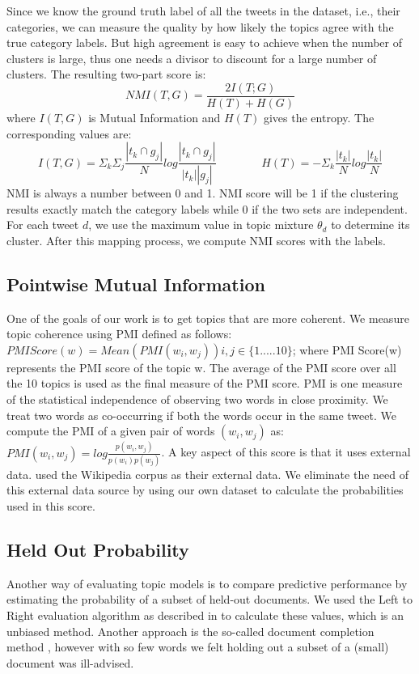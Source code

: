 \documentclass[10pt,a5paper,twoside]{article}
\begin{document}
Since we know the ground truth label of all the tweets in the dataset,
i.e., their categories, we can measure the quality by how likely the
topics agree with the true category labels.
But high agreement is easy to achieve when the number of clusters is
large, thus one needs a divisor to discount for a large number of clusters.
The resulting two-part score is:
\[
NMI(T,G) = \frac{2 I(T;G)}{H(T) + H(G)} 
\]
where $I(T,G)$ is Mutual Information and $H(T)$ gives the entropy. The 
corresponding values are:\vspace{-3pt}
\[
I(T,G) = \Sigma_{k} \Sigma_{j} \frac{|t_{k} \cap g_{j}|}{N} log \frac{|t_{k} \cap g_{j}|}{|t_{k}| |g_{j}|} 
~~~~~~~~~~~~~~~~~~
H(T) = - \Sigma_k \frac{|t_k|}{N} log \frac{|t_k|}{N} 
\]
NMI \cite{MRS08} is always a number between 0 and 1. NMI score will be
1 if the clustering results exactly match the category labels while 0
if the two sets are independent. For each tweet $d$, we use the
maximum value in topic mixture $ \theta_{d} $ to determine its
cluster. After this mapping process, we compute NMI scores with the
labels.


\subsection{Pointwise Mutual Information}

One of the goals of our work is to get topics that are more coherent. 
We measure topic coherence using PMI defined as follows:
$PMI Score(w) = Mean ( PMI(w_i,w_j) )  i,j \in \lbrace1.....10\rbrace $;
where PMI Score(w) represents the PMI score of the topic w. The average of the PMI score over all the 10 topics is used as the final measure of the PMI score. PMI is one measure of the statistical independence of observing two words in
close proximity. We treat two words as co-occurring if both the words occur in the same tweet. We compute the PMI of a given pair of words $(w_i, w_j)$ as:
$PMI (w_i,w_j) = log \frac{p(w_i,w_j)}{p(w_i)p(w_j)}$. 
A key aspect of this score is that it uses external data.  \cite{baldwin10} used the Wikipedia corpus as their external data. We eliminate the need of this external data source by using our own dataset to calculate the probabilities used in this score.

\subsection{Held Out Probability}
Another way of evaluating topic models is to compare predictive performance by estimating the probability of a subset of held-out documents.  We used the Left to Right evaluation algorithm as described in \cite{wallach} to calculate these values, 
which is an unbiased method.  Another approach is the so-called
document completion method \cite{wallach}, however with so few words we felt holding out a subset of a (small) document was ill-advised.
\end{document}
